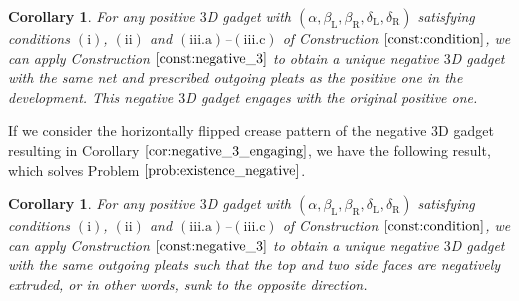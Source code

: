 \documentclass[11pt]{amsart}
\newtheorem{corollary}[theorem]{Corollary}
\numberwithin{equation}{section}
\numberwithin{theorem}{section}
\newcommand{\Lt}{\ensuremath{\mathrm{L}}}
\newcommand{\Rt}{\ensuremath{\mathrm{R}}}
\begin{document}
\begin{corollary}\label{cor:negative_3_engaging}
For any positive $3$D gadget with $(\alpha ,\beta_\Lt ,\beta_\Rt ,\delta_\Lt ,\delta_\Rt )$
satisfying conditions $(\mathrm{i})$, $(\mathrm{ii})$ and $(\mathrm{iii.a})$--$(\mathrm{iii.c})$ of Construction $\ref{const:condition}$, 
we can apply Construction $\ref{const:negative_3}$ to obtain a unique negative $3$D gadget
with the same net and prescribed outgoing pleats as the positive one in the development.
This negative $3$D gadget engages with the original positive one.
\end{corollary}
If we consider the horizontally flipped crease pattern of the negative $3$D gadget
resulting in Corollary $\ref{cor:negative_3_engaging}$, we have the following result, which solves Problem $\ref{prob:existence_negative}$.
\begin{corollary}
For any positive $3$D gadget with $(\alpha ,\beta_\Lt ,\beta_\Rt ,\delta_\Lt ,\delta_\Rt )$
satisfying conditions $(\mathrm{i})$, $(\mathrm{ii})$ and $(\mathrm{iii.a})$--$(\mathrm{iii.c})$ of Construction $\ref{const:condition}$,
we can apply Construction $\ref{const:negative_3}$ to obtain a unique negative $3$D gadget with the same outgoing pleats such that
the top and two side faces are negatively extruded, or in other words, sunk to the opposite direction.
\end{corollary}
\end{document}
